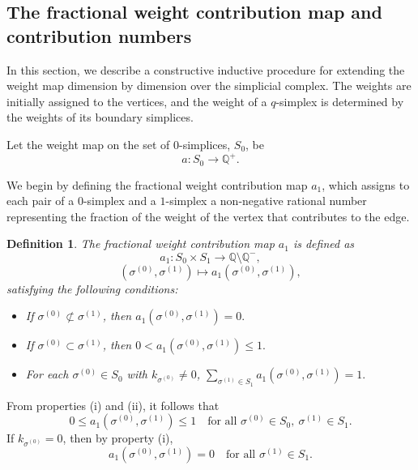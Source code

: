 \documentclass[12pt]{article}
\theoremstyle{normalhead_nobrackets}
\newtheorem{definition}{Definition}[section]
\theoremstyle{exampstyle}
\begin{document}
 
\subsection{The fractional weight contribution map and contribution numbers}

In this section, we describe a constructive inductive procedure for extending the weight map dimension by dimension over the simplicial complex. The weights are initially assigned to the vertices, and the weight of a $q$-simplex is determined by the weights of its boundary simplices.


Let the weight map on the set of $0$-simplices, $S_0$, be
\[
a : S_0 \to \mathbb{Q}^{+}.
\]

We begin by defining the fractional weight contribution map $a_1$, which assigns to each pair of a $0$-simplex and a $1$-simplex a non-negative rational number representing the fraction of the weight of the vertex that contributes to the edge.

\begin{definition}
    The fractional weight contribution map $a_1$ is defined as
\[
a_1 : S_0 \times S_1 \longrightarrow \mathbb{Q}\setminus \mathbb{Q}^-,
\]
\[
(\sigma^{(0)}, \sigma^{(1)}) \longmapsto a_1(\sigma^{(0)}, \sigma^{(1)}),
\]
satisfying the following conditions:

\begin{itemize}
    \item[(i)] If $\sigma^{(0)} \not\subset \sigma^{(1)}$, then 
    \(
    a_1(\sigma^{(0)}, \sigma^{(1)}) = 0.
    \)
    
    \item[(ii)] If $\sigma^{(0)} \subset \sigma^{(1)}$, then
    \(
    0 < a_1(\sigma^{(0)}, \sigma^{(1)}) \le 1.
    \)
    
    \item[(iii)] For each $\sigma^{(0)} \in S_0$ with $k_{\sigma^{(0)}} \neq 0$,
    \(
    \sum_{\sigma^{(1)} \in S_1}
    a_1(\sigma^{(0)}, \sigma^{(1)}) = 1.
    \)
\end{itemize}
\end{definition}

From properties (i) and (ii), it follows that
\[
0 \le a_1(\sigma^{(0)}, \sigma^{(1)}) \le 1
\quad
\text{for all } \sigma^{(0)} \in S_0,\ \sigma^{(1)} \in S_1.
\]
If $k_{\sigma^{(0)}} = 0$, then by property (i),
\[
a_1(\sigma^{(0)}, \sigma^{(1)}) = 0
\quad
\text{for all } \sigma^{(1)} \in S_1.
\]
\end{document}
